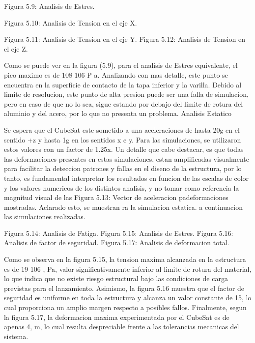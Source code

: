     Figura 5.9: Analisis de Estres.

    Figura 5.10: Analisis de Tension en el eje X.

    Figura 5.11: Analisis de Tension en el eje Y. Figura 5.12: Analisis de Tension en el eje Z.

    Como se puede ver en la figura (5.9), para el analisis de Estres equivalente, el pico maximo
    es de 108  106 P a. Analizando con mas detalle, este punto se encuentra en la superficie de
    contacto de la tapa inferior y la varilla. Debido al limite de resolucion, este punto de alta
    presion puede ser una falla de simulacion, pero en caso de que no lo sea, sigue estando por
    debajo del limite de rotura del aluminio y del acero, por lo que no presenta un problema.
    Analisis Estatico

    Se espera que el CubeSat este sometido a una aceleraciones de hasta 20g en el sentido +z y hasta 1g en
    los sentidos x e y. Para las simulaciones, se utilizaron
    estos valores con un factor de 1.25x. Un detalle que cabe destacar, es que todas las deformaciones presentes
    en estas simulaciones, estan amplificadas visualmente para facilitar la deteccion patrones y fallas en el
    diseno de la estructura, por lo tanto, es fundamental
    interpretar los resultados en funcion de las escalas de
    color y los valores numericos de los distintos analisis,
    y no tomar como referencia la magnitud visual de las
    Figura 5.13: Vector de aceleracion padeformaciones mostradas. Aclarado esto, se muestran
    ra la simulacion estatica.
    a continuacion las simulaciones realizadas.

    Figura 5.14: Analisis de Fatiga.
    Figura 5.15: Analisis de Estres.
    Figura 5.16: Analisis de factor de seguridad. Figura 5.17: Analisis de deformacion total.

    Como se observa en la figura 5.15, la tension
    maxima alcanzada en la estructura es de 19  106 , Pa, valor significativamente inferior al
    limite de rotura del material, lo que indica que no existe riesgo estructural bajo las
    condiciones de carga previstas para el lanzamiento. Asimismo, la figura 5.16 muestra que el factor
    de seguridad es uniforme en toda la estructura y alcanza un valor constante de 15, lo cual
    proporciona un amplio margen respecto a posibles fallos. Finalmente, segun la figura 5.17,
    la deformacion maxima experimentada por el CubeSat es de apenas 4, m, lo cual resulta
    despreciable frente a las tolerancias mecanicas del sistema.

